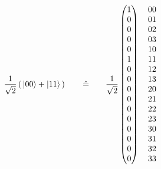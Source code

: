 \documentclass[12pt]{article}
\begin{document}
\begin{equation}
\frac{1}{\sqrt{2}} \left(\, \ket{00} + \ket{11} \,\right)
\quad\quad\hat{=}\quad\quad
\frac{1}{\sqrt{2}}
\begin{pmatrix}
1 \\ 0 \\ 0 \\ 0 \\ 0 \\ 1 \\ 0 \\ 0 \\ 0 \\ 0 \\ 0 \\ 0 \\ 0 \\ 0 \\ 0 \\ 0
\end{pmatrix}
\quad
\begin{matrix}
00 \\ 01 \\ 02 \\ 03 \\ 10 \\ 11 \\ 12 \\ 13 \\ 20 \\ 21 \\ 22 \\ 23 \\ 30 \\ 31 \\ 32 \\ 33 
\end{matrix}
\end{equation}
\end{document}
